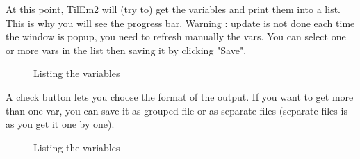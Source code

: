 \documentclass[10pt]{report}
\begin{document}
At this point, TilEm2 will (try to) get the variables and print them into a list.\newline
This is why you will see the progress bar.\newline
Warning : update is not done each time the window is popup, you need to refresh manually the vars.\newline\newline
You can select one or more vars in the list then saving it by clicking "Save".\newline
\begin{figure}[H]
\centering
{}
\caption{Listing the variables}
\end{figure}

A check button lets you choose the format of the output.\newline
If you want to get more than one var, you can save it as grouped file or as separate files (separate files is as you get it one by one).\newline

\begin{figure}[H]
\centering
{}
\caption{Listing the variables}
\end{figure}
\end{document}
